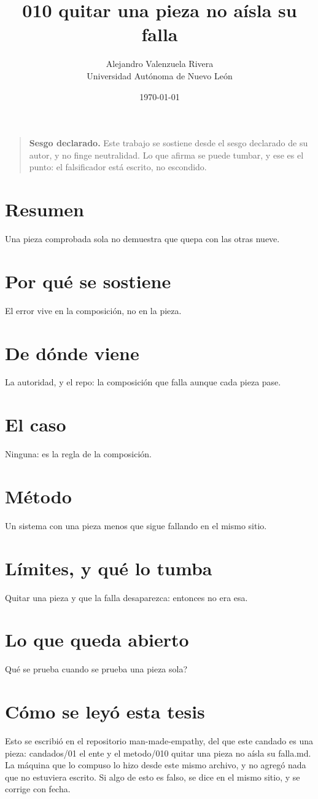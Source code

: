 \documentclass[11pt,a4paper]{article}
\title{010 quitar una pieza no aísla su falla}
\author{Alejandro Valenzuela Rivera\\\small Universidad Autónoma de Nuevo León}
\date{\today}
\begin{document}
\maketitle

\begin{quote}
\textbf{Sesgo declarado.} Este trabajo se sostiene desde el sesgo declarado de su autor, y no finge neutralidad. Lo que afirma se puede tumbar, y ese es el punto: el falsificador está escrito, no escondido.
\end{quote}

\section*{Resumen}
Una pieza comprobada sola no demuestra que quepa con las otras nueve.

\section{Por qué se sostiene}
El error vive en la composición, no en la pieza.

\section{De dónde viene}
La autoridad, y el repo: la composición que falla aunque cada pieza pase.

\section{El caso}
Ninguna: es la regla de la composición.

\section{Método}
Un sistema con una pieza menos que sigue fallando en el mismo sitio.

\section{Límites, y qué lo tumba}
Quitar una pieza y que la falla desaparezca: entonces no era esa.

\section{Lo que queda abierto}
\textquestiondown{}Qué se prueba cuando se prueba una pieza sola?

\section*{Cómo se leyó esta tesis}
Esto se escribió en el repositorio man-made-empathy, del que este candado es una pieza: candados/01 el ente y el metodo/010 quitar una pieza no aísla su falla.md. La máquina que lo compuso lo hizo desde este mismo archivo, y no agregó nada que no estuviera escrito. Si algo de esto es falso, se dice en el mismo sitio, y se corrige con fecha.
\end{document}
